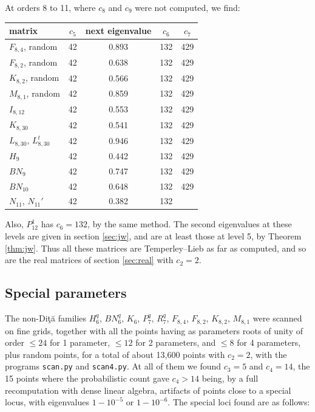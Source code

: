 \documentclass[11pt]{amsart}
\begin{document}
\medskip

\noindent At orders 8 to 11, where $c_8$ and $c_9$ were not computed, we find:

\medskip

\begin{center}
\begin{tabular}{lcccc}
\toprule
matrix & $c_5$ & next eigenvalue & $c_6$ & $c_7$\\
\midrule
$F_{8,4}$, random & 42 & 0.893 & 132 & 429 \\
$F_{8,2}$, random & 42 & 0.638 & 132 & 429 \\
$K_{8,2}$, random & 42 & 0.566 & 132 & 429 \\
$M_{8,1}$, random & 42 & 0.859 & 132 & 429 \\
$I_{8,12}$ & 42 & 0.553 & 132 & 429 \\
$K_{8,30}$ & 42 & 0.541 & 132 & 429 \\
$L_{8,30}$, $L_{8,30}^t$ & 42 & 0.946 & 132 & 429 \\
$H_9$ & 42 & 0.442 & 132 & 429 \\
$BN_9$ & 42 & 0.747 & 132 & 429 \\
$BN_{10}$ & 42 & 0.648 & 132 & 429 \\
$N_{11}$, $N_{11}'$ & 42 & 0.382 & 132 &  \\
\bottomrule
\end{tabular}
\end{center}

\medskip

\noindent Also, $P_{12}^1$ has $c_6=132$, by the same method. The second eigenvalues at these levels are given in section \ref{sec:jw}, and are at least those at level 5, by Theorem \ref{thm:jw}. Thus all these matrices are Temperley--Lieb as far as computed, and so are the real matrices of section \ref{sec:real} with $c_2=2$.

\subsection{Special parameters}

The non-Di\c t\u a families $H_6^q$, $BN_6^q$, $K_6$, $P_7^q$, $R_7^q$, $F_{8,4}$, $F_{8,2}$, $K_{8,2}$, $M_{8,1}$ were scanned on fine grids, together with all the points having as parameters roots of unity of order $\leq24$ for 1 parameter, $\leq12$ for 2 parameters, and $\leq8$ for 4 parameters, plus random points, for a total of about 13,600 points with $c_2=2$, with the programs \texttt{scan.py} and \texttt{scan4.py}. At all of them we found $c_3=5$ and $c_4=14$, the 15 points where the probabilistic count gave $c_4>14$ being, by a full recomputation with dense linear algebra, artifacts of points close to a special locus, with eigenvalues $1-10^{-5}$ or $1-10^{-6}$. The special loci found are as follows:
\end{document}

